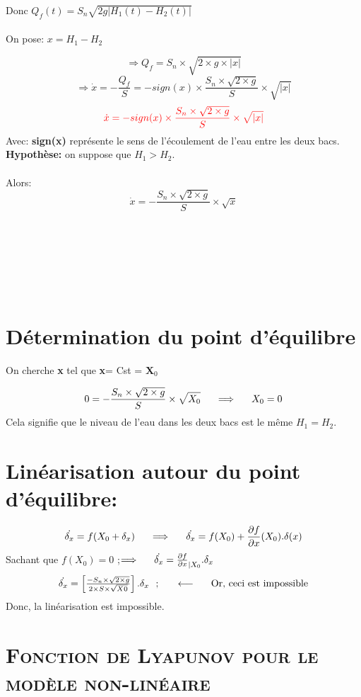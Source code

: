 Donc $Q_f(t)=S_n\sqrt{2g |H_1(t)-H_2(t)|}$\\\\
On pose:  $ x= H_1 - H_2$

\[\Longrightarrow Q_f=S_n\times \sqrt{2\times g \times |x|}\]
\[\Longrightarrow \dot{x}=-\frac{Q_f}{S}=-sign(x)\times \frac{S_n\times \sqrt{2\times g }}{S} \times \sqrt{|x|}\]
\[\color{red}\dot{x}=-sign(x)\times \frac{S_n\times \sqrt{2\times g }}{S} \times \sqrt{|x|}\]
 Avec: \textbf{sign(x)} représente le sens de l'écoulement de l'eau entre les deux bacs. \\
 
\textbf{Hypothèse:} on suppose que $H_1>H_2$.\\
\\
Alors:\indent \indent  \[\dot{x}= -\frac{S_n\times \sqrt{2\times g }}{S} \times \sqrt{x}\]
\\
\\
\\\\\\\\

\section{Détermination du point d'équilibre}

On cherche \textbf{x} tel que \textbf{x}= Cst = $\textbf{X}_0$

\[0=-\frac{S_n\times \sqrt{2\times g }}{S} \times \sqrt{X_0}\indent  \Longrightarrow \indent X_0 = 0\]
Cela signifie que le niveau de l'eau dans les deux bacs est le même $H_1=H_2$.

\section{Linéarisation autour du point d'équilibre:}

\[\dot{\delta_x}=f(X_0+\delta_x) \indent \Longrightarrow \indent \dot{\delta_x}=f(X_0)+\frac{\partial f}{\partial x}(X_0).\delta(x)\]
Sachant que $f(X_0)=0$ ;\indent  $\Longrightarrow \indent \dot{\delta_x}=\frac{\partial f}{\partial x}_{|X_0} . \delta_x$
\[\dot{\delta_x}=\begin{bmatrix}\frac{-S_n\times \sqrt{2\times g}}{2\times S \times \sqrt{X0}}\end{bmatrix}.\delta_x \ \ ; \indent \longleftarrow \indent \text{Or, ceci est impossible}\]
Donc, la linéarisation est impossible.	
	
\section{\textsc{Fonction de Lyapunov pour le modèle non-linéaire}}

